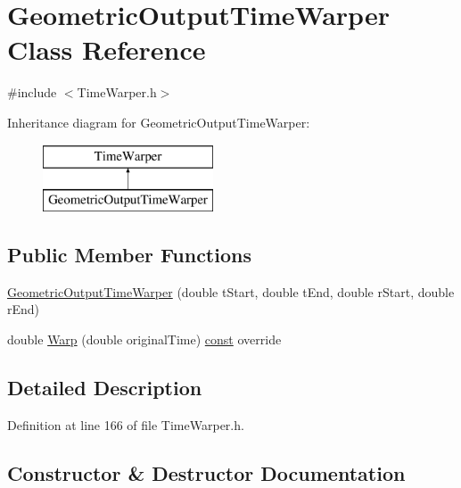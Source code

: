 \hypertarget{class_geometric_output_time_warper}{}\section{Geometric\+Output\+Time\+Warper Class Reference}
\label{class_geometric_output_time_warper}


{\ttfamily \#include $<$Time\+Warper.\+h$>$}

Inheritance diagram for Geometric\+Output\+Time\+Warper\+:\begin{figure}[H]
\begin{center}
\leavevmode
\includegraphics[height=2.000000cm]{class_geometric_output_time_warper}
\end{center}
\end{figure}
\subsection*{Public Member Functions}
\begin{DoxyCompactItemize}
\item 
\hyperlink{class_geometric_output_time_warper_a78d4bdca575be0f105bf97c650ffc623}{Geometric\+Output\+Time\+Warper} (double t\+Start, double t\+End, double r\+Start, double r\+End)
\item 
double \hyperlink{class_geometric_output_time_warper_a753407b406acf7775927b62e771f4ad9}{Warp} (double original\+Time) \hyperlink{getopt1_8c_a2c212835823e3c54a8ab6d95c652660e}{const}  override
\end{DoxyCompactItemize}


\subsection{Detailed Description}


Definition at line 166 of file Time\+Warper.\+h.



\subsection{Constructor \& Destructor Documentation}
